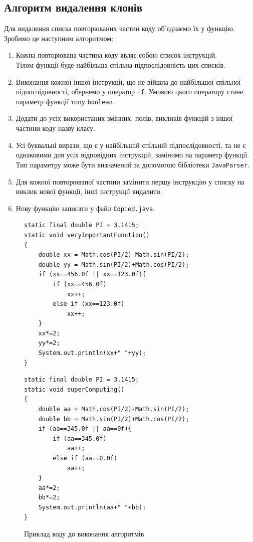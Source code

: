 \documentclass[a4paper, 14pt]{article}
\begin{document}
\subsection{Алгоритм видалення клонів}
Для видалення списка повторюваних частин коду об'єднаємо їх у функцію. \\
Зробимо це наступним алгоритмом: 
\begin{enumerate}
\item Кожна повторювана частина коду являє собою список інструкцій. \\
Тілом функції буде найбільша спільна підпослідовність цих списків.
\item Виконання кожної іншої інструкції, що не війшла до найбільшої спільної підпослідовності, обернемо у оператор \verb|if|.
Умовою цього оператору стане параметр функції типу \verb|boolean|.
\item Додати до усіх використаних змінних, полів, викликів функцій з іншої частини коду назву класу.
\item Усі буквальні вирази, що є у найбільшій спільній підпослідовності, та не є однаковими для усіх відповідних інструкцій, замінимо на параметр функції. Тип параметру може бути визначений за допомогою бібліотеки \verb|JavaParser|.
\item Для кожної повторюваної частини замінити першу інструкцію у списку на виклик нової функції, інші інструкції видалити.
\item Нову функцію записати у файл \verb|Copied.java|.
\end{enumerate}
\newpage
\begin{figure}[h!]
\centering
\begin{minipage}{.45\textwidth}
\begin{lstlisting}[frame=none]
static final double PI = 3.1415;
static void veryImportantFunction()
{
	double xx = Math.cos(PI/2)-Math.sin(PI/2);
	double yy = Math.sin(PI/2)+Math.cos(PI/2);
	if (xx==456.0f || xx==123.0f){
		if (xx==456.0f)
			xx++;
		else if (xx==123.0f)
			xx++;
	}
	xx*=2;
	yy*=2;
	System.out.println(xx+" "+yy);
}
\end{lstlisting}
\end{minipage}
\begin{minipage}{.45\textwidth}
\begin{lstlisting}[frame=none]
static final double PI = 3.1415;
static void superComputing()
{
	double aa = Math.cos(PI/2)-Math.sin(PI/2);
	double bb = Math.sin(PI/2)+Math.cos(PI/2);
	if (aa==345.0f || aa==0f){
		if (aa==345.0f)
			aa++;
		else if (aa==0.0f)
			aa++;
	}
	aa*=2;
	bb*=2;
	System.out.println(aa+" "+bb);
}
\end{lstlisting}
\end{minipage}
\caption{Приклад коду до виконання алгоритмів}
\end{figure}
\end{document}
